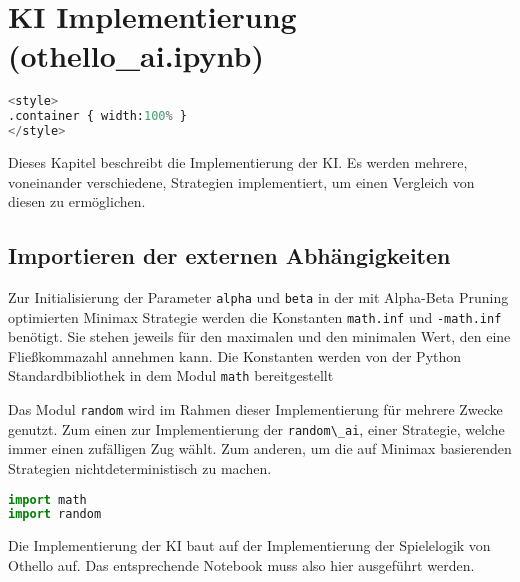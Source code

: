 \hypertarget{ki-implementierung-othello_ai.ipynb}{%
\section{KI Implementierung
(othello\_ai.ipynb)}\label{ki-implementierung-othello_ai.ipynb}}

\label{sec:aiimpl}

\begin{lstlisting}[language=Python]
%%HTML
<style>
.container { width:100% }
</style>
\end{lstlisting}

Dieses Kapitel beschreibt die Implementierung der \ac{KI}. Es werden
mehrere, voneinander verschiedene, Strategien implementiert, um einen
Vergleich von diesen zu ermöglichen.

\hypertarget{importieren-der-externen-abhuxe4ngigkeiten}{%
\subsection{Importieren der externen
Abhängigkeiten}\label{importieren-der-externen-abhuxe4ngigkeiten}}

Zur Initialisierung der Parameter \passthrough{\lstinline!alpha!} und
\passthrough{\lstinline!beta!} in der mit Alpha-Beta Pruning optimierten
Minimax Strategie werden die Konstanten
\passthrough{\lstinline!math.inf!} und
\passthrough{\lstinline!-math.inf!} benötigt. Sie stehen jeweils für den
maximalen und den minimalen Wert, den eine Fließkommazahl annehmen kann.
Die Konstanten werden von der Python Standardbibliothek in dem Modul
\passthrough{\lstinline!math!} bereitgestellt

Das Modul \passthrough{\lstinline!random!} wird im Rahmen dieser
Implementierung für mehrere Zwecke genutzt. Zum einen zur
Implementierung der \passthrough{\lstinline!random\_ai!}, einer
Strategie, welche immer einen zufälligen Zug wählt. Zum anderen, um die
auf Minimax basierenden Strategien nichtdeterministisch zu machen.

\begin{lstlisting}[language=Python]
import math
import random
\end{lstlisting}

Die Implementierung der \ac{KI} baut auf der Implementierung der
Spielelogik von Othello auf. Das entsprechende Notebook muss also hier
ausgeführt werden.

\begin{lstlisting}[language=Python]
%run othello_game.ipynb
\end{lstlisting}

